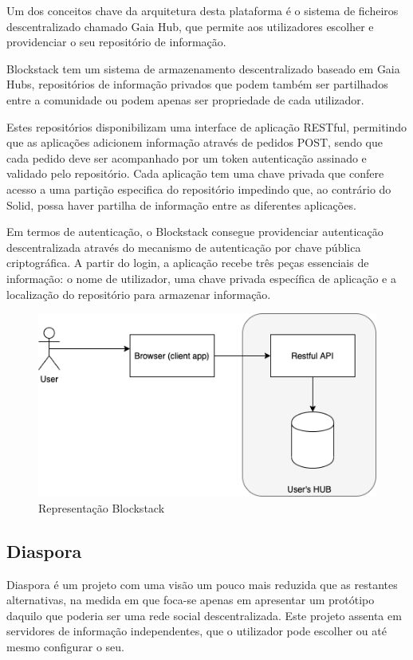 Um dos conceitos chave da arquitetura desta plataforma é o sistema de ficheiros descentralizado chamado Gaia Hub, que permite aos utilizadores escolher e providenciar o seu repositório de informação.

Blockstack tem um sistema de armazenamento descentralizado baseado em Gaia Hubs, repositórios de informação privados que podem também ser partilhados entre a comunidade ou podem apenas ser propriedade de cada utilizador. 

Estes repositórios disponibilizam uma interface de aplicação RESTful, permitindo que as aplicações adicionem informação através de pedidos POST, sendo que cada pedido deve ser acompanhado por um token autenticação assinado e validado pelo repositório. Cada aplicação tem uma chave privada que confere acesso a uma partição especifica do repositório impedindo que, ao contrário do Solid, possa haver partilha de informação entre as diferentes aplicações.\cite{blockstack_white_paper}

Em termos de autenticação, o Blockstack consegue providenciar autenticação descentralizada através do mecanismo de autenticação por chave pública criptográfica. A partir do login, a aplicação recebe três peças essenciais de informação: o nome de utilizador, uma chave privada específica de aplicação e a localização do repositório para armazenar informação.\cite{blockstack_white_paper}

\begin{figure}[H]
    \begin{center}
    \includegraphics[width=1\textwidth]{figures/estado_arte-Blockstack.png}
    \caption{Representação Blockstack}
    \end{center}
\end{figure}

\subsection{Diaspora}
Diaspora é um projeto com uma visão um pouco mais reduzida que as restantes alternativas, na medida em que foca-se apenas em apresentar um protótipo daquilo que poderia ser uma rede social descentralizada. Este projeto assenta em servidores de informação independentes, que o utilizador pode escolher ou até mesmo configurar o seu. \cite{diaspora_wiki}

